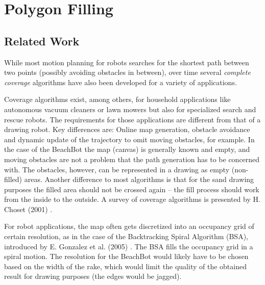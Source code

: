 \section{Polygon Filling}

\subsection{Related Work}

While most motion planning for robots searches for the shortest path between two points (possibly avoiding obstacles in between), over time several \textit{complete coverage} algorithms have also been developed for a variety of applications. 


Coverage algorithms exist, among others, for household applications like autonomous vacuum cleaners or lawn mowers but also for specialized search and rescue robots. The requirements for those applications are different from that of a drawing robot. Key differences are: Online map generation, obstacle avoidance and dynamic update of the trajectory to omit moving obstacles, for example. In the case of the BeachBot the map (canvas) is generally known and empty, and moving obstacles are not a problem that the path generation has to be concerned with. The obstacles, however, can be represented in a drawing as empty (non-filled) areas. Another difference to most algorithms is that for the sand drawing purposes the filled area should not be crossed again -- the fill process should work from the inside to the outside.
A survey of coverage algorithms is presented by H. Choset (2001) \cite{choset2001coverage}.


For robot applications, the map often gets discretized into an occupancy grid of certain resolution, as in the case of the Backtracking Spiral Algorithm (BSA), introduced by E. Gonzalez et al.  (2005) \cite{gonzalez2005bsa}. The BSA fills the occupancy grid in a spiral motion. The resolution for the BeachBot would likely have to be chosen based on the width of the rake, which would limit the quality of the obtained result for drawing purposes (the edges would be jagged).

